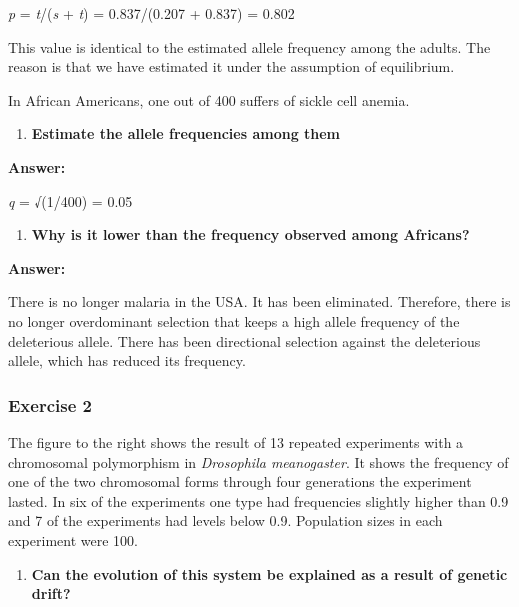 \documentclass[]{article}
\providecommand{\tightlist}{%
  \setlength{\itemsep}{0pt}\setlength{\parskip}{0pt}}
\begin{document}
\emph{p} = \emph{t}/(\emph{s} + \emph{t}) = 0.837/(0.207 + 0.837) =
0.802

This value is identical to the estimated allele frequency among the
adults. The reason is that we have estimated it under the assumption of
equilibrium.

In African Americans, one out of 400 suffers of sickle cell anemia.

\begin{enumerate}
\def\labelenumi{\arabic{enumi})}
\setcounter{enumi}{3}
\tightlist
\item
  \textbf{Estimate the allele frequencies among them}
\end{enumerate}

\textbf{Answer:}

\emph{q} = √(1/400) = 0.05

\begin{enumerate}
\def\labelenumi{\arabic{enumi})}
\setcounter{enumi}{4}
\tightlist
\item
  \textbf{Why is it lower than the frequency observed among Africans?}
\end{enumerate}

\textbf{Answer:}

There is no longer malaria in the USA. It has been eliminated.
Therefore, there is no longer overdominant selection that keeps a high
allele frequency of the deleterious allele. There has been directional
selection against the deleterious allele, which has reduced its
frequency.

\hypertarget{exercise-2}{%
\subsubsection{Exercise 2}\label{exercise-2}}

The figure to the right shows the result of 13 repeated experiments with
a chromosomal polymorphism in \emph{Drosophila meanogaster}. It shows
the frequency of one of the two chromosomal forms through four
generations the experiment lasted. In six of the experiments one type
had frequencies slightly higher than 0.9 and 7 of the experiments had
levels below 0.9. Population sizes in each experiment were 100.

\begin{enumerate}
\def\labelenumi{\arabic{enumi})}
\tightlist
\item
  \textbf{Can the evolution of this system be explained as a result of
  genetic drift?}
\end{enumerate}
\end{document}
